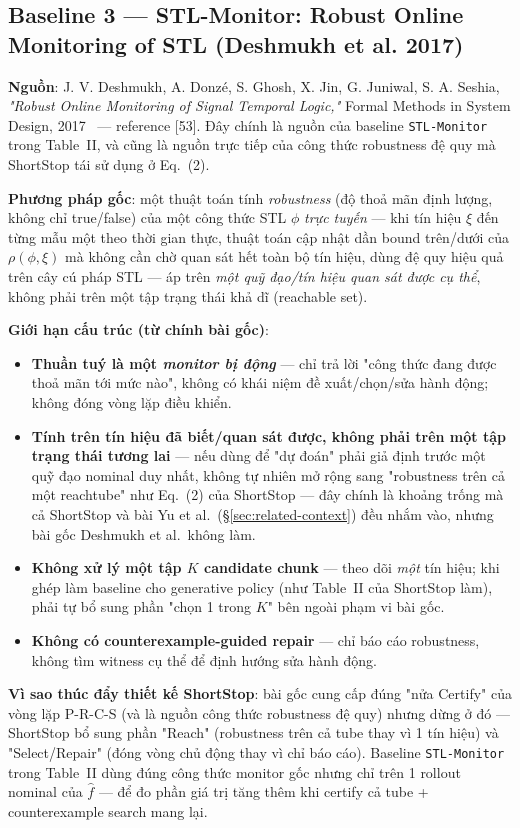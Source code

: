 \documentclass[a4paper,12pt]{article}
\begin{document}
\subsection{Baseline 3 --- STL-Monitor: Robust Online Monitoring of STL (Deshmukh et al. 2017)}
\textbf{Nguồn}: J. V. Deshmukh, A. Donzé, S. Ghosh, X. Jin, G. Juniwal, S. A. Seshia, \emph{"Robust Online Monitoring of Signal Temporal Logic,"} Formal Methods in System Design, 2017~\cite{deshmukh2017robust} --- reference [53]. Đây chính là nguồn của baseline \texttt{STL-Monitor} trong Table~II, và cũng là nguồn trực tiếp của công thức robustness đệ quy mà ShortStop tái sử dụng ở Eq.~(2).

\textbf{Phương pháp gốc}: một thuật toán tính \emph{robustness} (độ thoả mãn định lượng, không chỉ true/false) của một công thức STL $\phi$ \emph{trực tuyến} --- khi tín hiệu $\xi$ đến từng mẫu một theo thời gian thực, thuật toán cập nhật dần bound trên/dưới của $\rho(\phi,\xi)$ mà không cần chờ quan sát hết toàn bộ tín hiệu, dùng đệ quy hiệu quả trên cây cú pháp STL --- áp trên \emph{một quỹ đạo/tín hiệu quan sát được cụ thể}, không phải trên một tập trạng thái khả dĩ (reachable set).

\textbf{Giới hạn cấu trúc (từ chính bài gốc)}:
\begin{itemize}
  \item \textbf{Thuần tuý là một \emph{monitor bị động}} --- chỉ trả lời "công thức đang được thoả mãn tới mức nào", không có khái niệm đề xuất/chọn/sửa hành động; không đóng vòng lặp điều khiển.
  \item \textbf{Tính trên tín hiệu đã biết/quan sát được, không phải trên một tập trạng thái tương lai} --- nếu dùng để "dự đoán" phải giả định trước một quỹ đạo nominal duy nhất, không tự nhiên mở rộng sang "robustness trên cả một reachtube" như Eq.~(2) của ShortStop --- đây chính là khoảng trống mà cả ShortStop và bài Yu et al.\ (\S\ref{sec:related-context}) đều nhắm vào, nhưng bài gốc Deshmukh et al.\ không làm.
  \item \textbf{Không xử lý một tập $K$ candidate chunk} --- theo dõi \emph{một} tín hiệu; khi ghép làm baseline cho generative policy (như Table~II của ShortStop làm), phải tự bổ sung phần "chọn 1 trong $K$" bên ngoài phạm vi bài gốc.
  \item \textbf{Không có counterexample-guided repair} --- chỉ báo cáo robustness, không tìm witness cụ thể để định hướng sửa hành động.
\end{itemize}

\textbf{Vì sao thúc đẩy thiết kế ShortStop}: bài gốc cung cấp đúng "nửa Certify" của vòng lặp P-R-C-S (và là nguồn công thức robustness đệ quy) nhưng dừng ở đó --- ShortStop bổ sung phần "Reach" (robustness trên cả tube thay vì 1 tín hiệu) và "Select/Repair" (đóng vòng chủ động thay vì chỉ báo cáo). Baseline \texttt{STL-Monitor} trong Table~II dùng đúng công thức monitor gốc nhưng chỉ trên 1 rollout nominal của $\hat f$ --- để đo phần giá trị tăng thêm khi certify cả tube + counterexample search mang lại.
\end{document}
